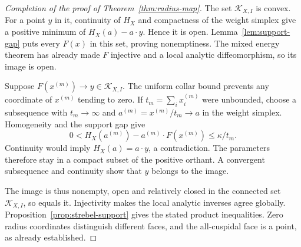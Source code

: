 \documentclass[11pt,a4paper]{article}
\theoremstyle{definition}
\begin{document}
\begin{proof}[Completion of the proof of Theorem~\ref{thm:radius-map}]
The set $\mathcal K_{X,I}$ is convex. For a point $y$ in it, continuity of $H_X$ and compactness of the weight simplex give a positive minimum of $H_X(a)-a\cdot y$. Hence it is open. Lemma~\ref{lem:support-gap} puts every $F(x)$ in this set, proving nonemptiness. The mixed energy theorem has already made $F$ injective and a local analytic diffeomorphism, so its image is open.

Suppose $F(x^{(m)})\to y\in\mathcal K_{X,I}$. The uniform collar bound prevents any coordinate of $x^{(m)}$ tending to zero. If $t_m=\sum_i x_i^{(m)}$ were unbounded, choose a subsequence with $t_m\to\infty$ and $a^{(m)}=x^{(m)}/t_m\to a$ in the weight simplex. Homogeneity and the support gap give
\[
 0<H_X(a^{(m)})-a^{(m)}\cdot F(x^{(m)})\le\kappa/t_m.
\]
Continuity would imply $H_X(a)=a\cdot y$, a contradiction. The parameters therefore stay in a compact subset of the positive orthant. A convergent subsequence and continuity show that $y$ belongs to the image.

The image is thus nonempty, open and relatively closed in the connected set $\mathcal K_{X,I}$, so equals it. Injectivity makes the local analytic inverses agree globally. Proposition~\ref{prop:strebel-support} gives the stated product inequalities. Zero radius coordinates distinguish different faces, and the all-cuspidal face is a point, as already established.
\end{proof}
\end{document}
